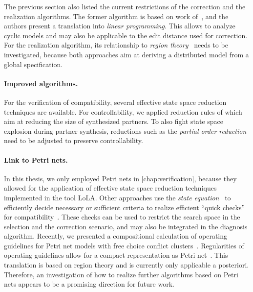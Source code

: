 The previous section also listed the current restrictions of the correction and the realization algorithms. The former algorithm is based on work of~\citet{SokolskyKL_2006_tacas}, and the authors present a translation into \emph{linear programming}. This allows to analyze cyclic models and may also be applicable to the edit distance used for correction. For the realization algorithm, its relationship to \emph{region theory}~\cite{BadouelD_1996_acpn} needs to be investigated, because both approaches aim at deriving a distributed model from a global specification.


\paragraph{Improved algorithms.}

For the verification of compatibility, several effective state space reduction techniques are available. For controllability, we applied reduction rules of \citet{Weinberg_2008_wsfm} which aim at reducing the size of synthesized partners. To also fight state space explosion during partner synthesis, reductions such as the \emph{partial order reduction} need to be adjusted to preserve controllability.


\paragraph{Link to Petri nets.}

In this thesis, we only employed Petri nets in \autoref{chap:verification}, because they allowed for the application of effective state space reduction techniques implemented in the tool LoLA. Other approaches use the \emph{state equation}~\cite{Lautenbach_1975_tr} to efficiently decide necessary or sufficient criteria to realize efficient ``quick checks'' for compatibility~\cite{SurmeliW_2009_zeus,OaneaW_2009_zeus}. These checks can be used to restrict the search space in the selection and the correction scenario, and may also be integrated in the diagnosis algorithm. Recently, we presented a compositional calculation of operating guidelines for Petri net models with free choice conflict clusters~\cite{Lohmann_2008_awpn}. Regularities of operating guidelines allow for a compact representation as Petri net~\cite{LohmannW_2009_acsd}. This translation is based on region theory and is currently only applicable a posteriori. Therefore, an investigation of how to realize further algorithms based on Petri nets appears to be a promising direction for future work.


